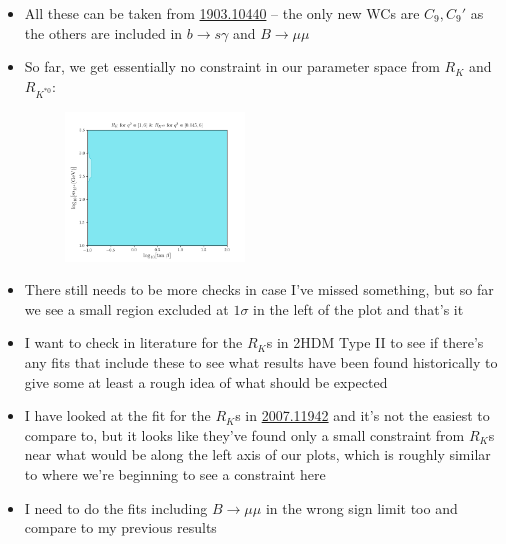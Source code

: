 \documentclass[11pt]{article}
\begin{document}
\begin{itemize}
    \item All these can be taken from \href{https://arxiv.org/pdf/1903.10440.pdf}{1903.10440} -- the only new WCs are $C_9,C_9'$ as the others are included in $b\to s\gamma$ and $B\to\mu\mu$
    \item So far, we get essentially no constraint in our parameter space from $R_K$ and $R_{K^{*0}}$:
        \begin{figure}[H]
            \centering
            \includegraphics[width=0.45\textwidth]{rks_plot.png}
        \end{figure}
    \item There still needs to be more checks in case I've missed something, but so far we see a small region excluded at $1\sigma$ in the left of the plot and that's it
    \item I want to check in literature for the $R_K$s in 2HDM Type II to see if there's any fits that include these to see what results have been found historically to give some at least a rough idea of what should be expected
    \item I have looked at the fit for the $R_K$s in \href{https://arxiv.org/pdf/2007.11942.pdf}{2007.11942} and it's not the easiest to compare to, but it looks like they've found only a small constraint from $R_K$s near what would be along the left axis of our plots, which is roughly similar to where we're beginning to see a constraint here
    \item I need to do the fits including $B\to\mu\mu$ in the wrong sign limit too and compare to my previous results
\end{itemize}
\end{document}
